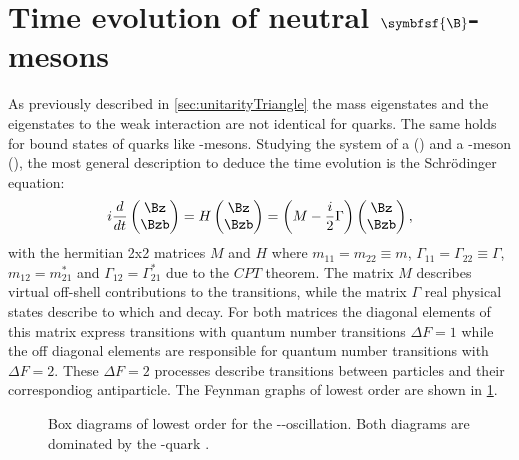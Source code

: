 \section[head={Time evolution of neutral \B-mesons},tocentry={Time evolution of neutral $\symbfsf{\B}$-mesons}]{Time evolution of neutral $\symbfsf{\B}$-mesons}
\label{sec:TimeEvolution}

As previously described in \cref{sec:unitarityTriangle} the mass eigenstates and the eigenstates to the weak interaction are not identical for
quarks. The same holds for bound states of quarks like \B-mesons. Studying the system of a \Bz (\bquarkbar\dquark) and a \Bzb-meson
(\bquark\dquarkbar), the most general description to deduce the time evolution is the Schrödinger equation:
\begin{equation}
i\frac{d}{dt}\begin{pmatrix} \Bz \\ \Bzb \end{pmatrix} = H \begin{pmatrix} \Bz \\ \Bzb \end{pmatrix}
=\left(M-\frac{i}{2}\Gamma\right)\begin{pmatrix} \Bz \\ \Bzb \end{pmatrix},
\end{equation}
with the hermitian 2x2 matrices $M$ and $H$ where $m_{11}=m_{22}\equiv m$, $\Gamma_{11}=\Gamma_{22}\equiv\Gamma$, $m_{12}=m_{21}^\ast$ and $\Gamma_{12}=\Gamma_{21}^\ast$ due to the $CPT$ theorem.
The matrix $M$ describes virtual off-shell contributions to the transitions, while the matrix $\Gamma$ real physical states describe to which \Bz and \Bzb decay.
For both matrices the diagonal elements of this matrix express transitions with quantum number transitions $\Delta F=1$ while the off diagonal elements are responsible for quantum number transitions with $\Delta F=2$.
These $\Delta F=2$ processes describe transitions between particles and their correspondiog antiparticle.
The Feynman graphs of lowest order are shown in \cref{fig:FeynmanMixing}.
\begin{figure}[tbp]
	\centering
	
	\hspace{0.5cm}
	
	\caption{Box diagrams of lowest order for the \Bz-\Bzb-oscillation. Both diagrams are dominated by the \tquark-quark \cite{Ellis:2016jkw}.}
	\label{fig:FeynmanMixing}
\end{figure}
